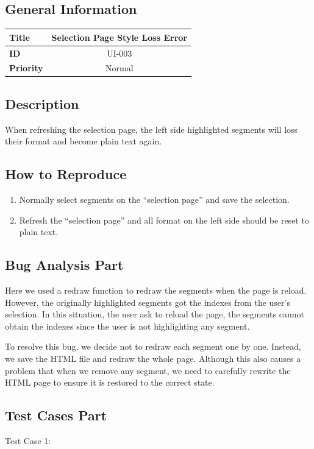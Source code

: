 \documentclass[twoside,a4paper]{refart}
\begin{document}
\subsection*{General Information}
\begin{table}[!h]
\begin{tabular}{|l|c|}
\hline
\textbf{Title} & Selection Page Style Loss Error \\ \hline
\textbf{ID} & UI-003 \\ \hline
\textbf{Priority} & Normal \\ \hline
\end{tabular}
\end{table}

\subsection*{Description}
When refreshing the selection page, the left side highlighted segments will loss their format and become plain text again.

\subsection*{How to Reproduce}
\begin{enumerate}
\item Normally select segments on the \enquote{selection page} and save the selection.
\item Refresh the \enquote{selection page} and all format on the left side should be reset to plain text.
\end{enumerate}

\subsection{Bug Analysis Part}
Here we used a redraw function to redraw the segments when the page is reload. However, the originally highlighted segments got the indexes from the user's selection. In this situation, the user ask to reload the page, the segments cannot obtain the indexes since the user is not highlighting any segment.

To resolve this bug, we decide not to redraw each segment one by one. Instead, we save the HTML file and redraw the whole page. Although this also causes a problem that when we remove any segment, we need to carefully rewrite the HTML page to ensure it is restored to the correct state.


\subsection{Test Cases Part}
Test Case 1:
\end{document}
